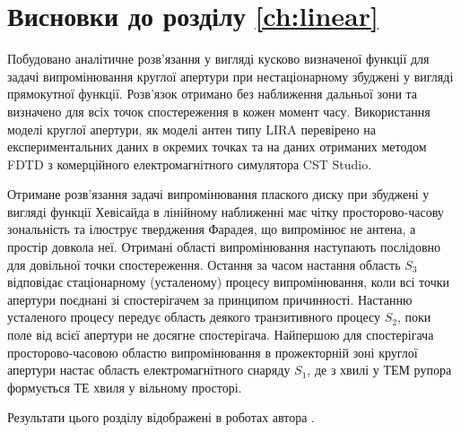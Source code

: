 \section*{Висновки до розділу \ref{ch:linear}}

Побудовано аналітичне розв'язання у вигляді кусково визначеної функції для 
задачі випромінювання круглої апертури при нестаціонарному збуджені у 
вигляді прямокутної функції. Розв'язок отримано без наближення дальньої 
зони та визначено для всіх точок спостереження в кожен момент часу. 
Використання моделі круглої апертури, як моделі антен типу LIRA перевірено 
на експериментальних даних в окремих точках та на даних отриманих методом 
FDTD з комерційного електромагнітного симулятора CST Studio.

Отримане розв'язання задачі випромінювання плаского диску при збуджені у 
вигляді функції Хевісайда в лінійному наближенні має чітку просторово-часову 
зональність та ілюструє твердження Фарадея, що випромінює не антена, а 
простір довкола неї. Отримані області випромінювання наступають послідовно 
для довільної точки спостереження. Остання за часом настання область $ S_3 $ 
відповідає стаціонарному (усталеному) процесу випромінювання, коли всі точки 
апертури поєднані зі спостерігачем за принципом причинності. Настанню 
усталеного процесу передує область деякого транзитивного процесу $ S_2 $, 
поки поле від всієї апертури не досягне спостерігача. Найпершою для 
спостерігача просторово-часовою областю випромінювання в прожекторній зоні 
круглої апертури настає область електромагнітного снаряду $ S_1 $, де з 
хвилі у ТЕМ рупора формується ТЕ хвиля у вільному просторі.

Результати цього розділу відображені в роботах автора 
\cite{my:Telecom2018, my:UKRCON2017, my:UWBUSIS2018, my:UKRCON2019}.
